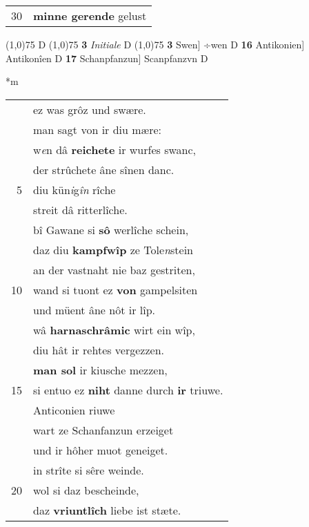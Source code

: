\documentclass[8pt,a4paper,notitlepage]{article}
\begin{document}
\begin{table}[ht]
\begin{minipage}[t]{0.5\linewidth}
\begin{tabular}{rl}
30 & \textbf{minne gerende} gelust\\ 
\end{tabular}
\scriptsize
\line(1,0){75} \newline
D \newline
\line(1,0){75} \newline
\textbf{3} \textit{Initiale} D  \newline
\line(1,0){75} \newline
\textbf{3} Swen] ÷wen D \textbf{16} Antikonien] Antikonîen D \textbf{17} Schanpfanzun] Scanpfanzvn D \newline
\end{minipage}
\hspace{0.5cm}
\begin{minipage}[t]{0.5\linewidth}
\small
\begin{center}*m
\end{center}
\begin{tabular}{rl}
 & ez was grôz und swære.\\ 
 & man sagt von ir diu mære:\\ 
 & w\textit{e}n dâ \textbf{reichete} ir wurfes swanc,\\ 
 & der strûchete âne sînen danc.\\ 
5 & diu kün\textit{i}g\textit{în} rîche\\ 
 & streit dâ ritterlîche.\\ 
 & bî Gawane si \textbf{sô} werlîche schein,\\ 
 & daz diu \textbf{kampfwîp} ze Tole\textit{n}stein\\ 
 & an der vastnaht nie baz gestriten,\\ 
10 & wand si tuont ez \textbf{von} gampelsiten\\ 
 & und müent âne nôt ir lîp.\\ 
 & wâ \textbf{harnaschrâmic} wirt ein wîp,\\ 
 & diu hât ir rehtes vergezzen.\\ 
 & \textbf{man sol} ir kiusche mezzen,\\ 
15 & si entuo ez \textbf{niht} danne durch \textbf{ir} triuwe.\\ 
 & Anticonien riuwe\\ 
 & wart ze Schanfanzun erzeiget\\ 
 & und ir hôher muot geneiget.\\ 
 & in strîte si sêre weinde.\\ 
20 & wol si daz bescheinde,\\ 
 & daz \textbf{vriuntlîch} liebe ist stæte.\\ 

\end{tabular}
\end{minipage}
\end{table}
\end{document}
